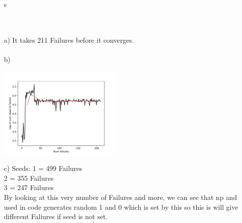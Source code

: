 \newcommand\tab[1][1cm]{\hspace*{#1}}s
\begin{answer}
\\ \\
a) It takes 211  Failures before it converges. \\ \\
b) \begin{center}
  \includegraphics[width=6cm]{cartpole/control.pdf}
\end{center}

c) Seeds:
\tab 1 = 499 Failures \\ 
\tab 2 = 355 Failures \\ 
\tab 3 = 247 Failures \\ 
By looking at this very number of Failures and more, we can see that np and used in code generates random 1 and 0 which is set by this so this is will give different Faliures if seed is not set. \\ \\
\\ \\
\end{answer}